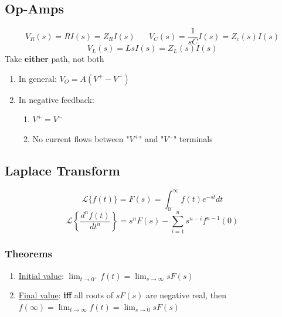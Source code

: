 \documentclass[twocolumn, 12pt]{article}    %
\begin{document}
\subsection*{Op-Amps}%
\begin{equation*}
    V_R(s) = RI(s) = Z_RI(s) \hspace{20pt} V_C(s) = \frac{1}{sC}I(s) = Z_c(s)I(s) 
\end{equation*}
\begin{equation*}
    V_L(s) = LsI(s) =Z_L(s)I(s)
\end{equation*}
\noindent
Take \textbf{either} path, not both
\begin{enumerate}
    \item In general: \(V_O = A(V^+-V^-)\)
    \item In negative feedback:
    \begin{enumerate}
        \item \(V^+ = V^-\)
        \item No current flows between "\(V^+\)" and "\(V^-\)"  \hspace{25pt} terminals
    \end{enumerate}
\end{enumerate}


\subsection*{Laplace Transform}
\begin{equation*}
    \mathcal{L}\{f(t)\} = F(s) = \int_{0^-}^\infty f(t)e^{-st}dt
\end{equation*}
\begin{equation*}
    \mathcal{L}\left\{\frac{d^nf(t)}{dt^n} \right\} = s^nF(s) - \sum^n_{i=1} s^{n-i} f^{n-1}(0)
\end{equation*}


\subsubsection*{Theorems}
\noindent
\begin{enumerate}
    \item \underline{Initial value}: \(\lim_{t\to 0^+} f(t) = \lim_{s\to \infty } sF(s)\) 
    \item \underline{Final value}: \textbf{iff} all roots of \(sF(s)\) are negative real, then \(f(\infty) = \lim_{t\to\infty} f(t) = \lim_{s\to0} sF(s)\)
\end{enumerate}
\end{document}
